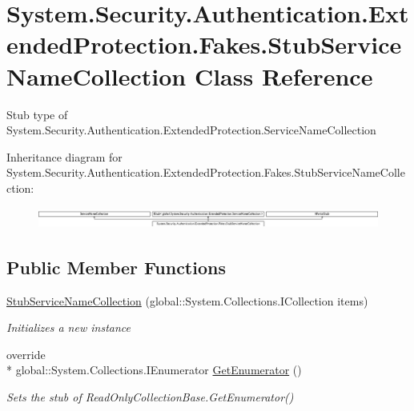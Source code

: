 \hypertarget{class_system_1_1_security_1_1_authentication_1_1_extended_protection_1_1_fakes_1_1_stub_service_name_collection}{\section{System.\-Security.\-Authentication.\-Extended\-Protection.\-Fakes.\-Stub\-Service\-Name\-Collection Class Reference}
\label{class_system_1_1_security_1_1_authentication_1_1_extended_protection_1_1_fakes_1_1_stub_service_name_collection}
}


Stub type of System.\-Security.\-Authentication.\-Extended\-Protection.\-Service\-Name\-Collection 


Inheritance diagram for System.\-Security.\-Authentication.\-Extended\-Protection.\-Fakes.\-Stub\-Service\-Name\-Collection\-:\begin{figure}[H]
\begin{center}
\leavevmode
\includegraphics[height=0.699126cm]{class_system_1_1_security_1_1_authentication_1_1_extended_protection_1_1_fakes_1_1_stub_service_name_collection}
\end{center}
\end{figure}
\subsection*{Public Member Functions}
\begin{DoxyCompactItemize}
\item 
\hyperlink{class_system_1_1_security_1_1_authentication_1_1_extended_protection_1_1_fakes_1_1_stub_service_name_collection_a9f457be7424ff972b0491e159bfb0b17}{Stub\-Service\-Name\-Collection} (global\-::\-System.\-Collections.\-I\-Collection items)
\begin{DoxyCompactList}\small\item\em Initializes a new instance\end{DoxyCompactList}\item 
override \\*
global\-::\-System.\-Collections.\-I\-Enumerator \hyperlink{class_system_1_1_security_1_1_authentication_1_1_extended_protection_1_1_fakes_1_1_stub_service_name_collection_a6d2611bc770ac25da0e349680cc9149a}{Get\-Enumerator} ()
\begin{DoxyCompactList}\small\item\em Sets the stub of Read\-Only\-Collection\-Base.\-Get\-Enumerator()\end{DoxyCompactList}\end{DoxyCompactItemize}

